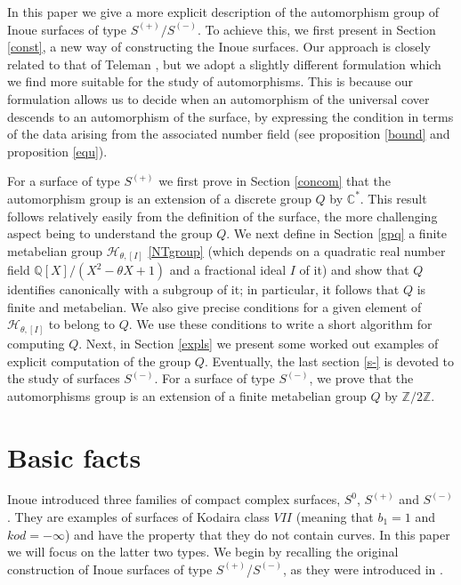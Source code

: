 \documentclass[12pt]{amsart}
\newcommand{\Z}{\mathbb{Z}}
\newcommand{\C}{\mathbb{C}}
\newcommand{\Q}{\mathbb{Q}}
\begin{document}
\noindent
In this paper we give a more explicit description of the automorphism group of Inoue surfaces of type $S^{(+)}/S^{(-)}$. To achieve this, we first present in Section \ref{const}, a new way of constructing the Inoue surfaces. Our approach is closely related to that of Teleman \cite{KT}, but we adopt a slightly different formulation which we find more suitable for the study of automorphisms. This is because our formulation allows us  to decide when an automorphism of the universal cover descends to an automorphism of the surface, by expressing the condition in terms of the data arising from the associated number field (see proposition \ref{bound} and proposition \ref{equ}).\par

\noindent
For a surface of type $S^{(+)}$ we first prove in Section \ref{concom} that the automorphism group is an extension of a discrete group $Q$ by $\C^*$. This result follows relatively easily from the definition of the surface, the more challenging aspect being to understand the group $Q$. We next define in Section \ref{gpq} a finite metabelian group $\mathcal{H}_{\theta, [I]}$ \ref{NTgroup} (which depends on a quadratic real number field $\Q[X]/(X^2-\theta X +1)$ and a fractional ideal $I$ of it) and show that $Q$ identifies canonically with a subgroup of it; in particular, it follows that $Q$ is finite and metabelian. We also give precise conditions for a given element of $\mathcal{H}_{\theta, [I]}$ to belong to $Q$. We use these conditions to write a short algorithm for computing $Q$. Next, in Section \ref{expls} we present some worked out examples of explicit computation of the group $Q$. Eventually, the last section \ref{s-} is devoted to the study of surfaces $S^{(-)}$. For a surface of type $S^{(-)}$, we prove that the automorphisms group is an extension of a finite metabelian group $Q$ by $\Z/2\Z$. 

\hfill

\section{Basic facts}
Inoue introduced three families of compact complex surfaces, $S^0$, $S^{(+)}$ and $S^{(-)}$. They are examples of surfaces of Kodaira class $VII$ (meaning that $b_1=1$ and $kod = -\infty$) and have the property that they do not contain curves. In this paper we will focus on the latter two types. We begin by recalling the original construction of Inoue surfaces of type $S^{(+)}$/$S^{(-)}$, as they were introduced in \cite{Ino}.\par
\end{document}
